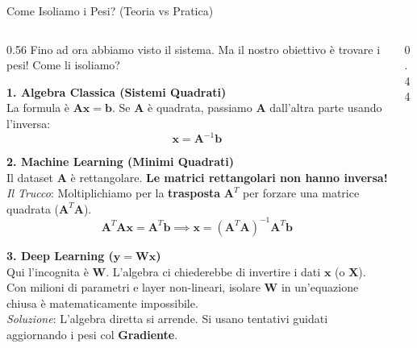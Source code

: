 \documentclass[aspectratio=169, 10pt]{beamer}
\begin{document}
\begin{frame}{Come Isoliamo i Pesi? (Teoria vs Pratica)}
    \begin{columns}[T,onlytextwidth]
        \setlength{\columnsep}{0.3cm}
        
        \begin{column}{0.56\textwidth}
            \vspace{0.1cm}
            \footnotesize
            Fino ad ora abbiamo visto il sistema. Ma il nostro obiettivo è trovare i pesi! Come li isoliamo?
            
            \vspace{0.2cm}
            \textbf{1. Algebra Classica (Sistemi Quadrati)}\\
            La formula è $\mathbf{A}\mathbf{x} = \mathbf{b}$. Se $\mathbf{A}$ è quadrata, passiamo $\mathbf{A}$ dall'altra parte usando l'inversa:
            \[ \mathbf{x} = \mathbf{A}^{-1}\mathbf{b} \]
            
            \vspace{0.1cm}
            \textbf{2. Machine Learning (Minimi Quadrati)}\\
            Il dataset $\mathbf{A}$ è rettangolare. \textbf{Le matrici rettangolari non hanno inversa!} 
            \\ \textit{Il Trucco}: Moltiplichiamo per la \textbf{trasposta} $\mathbf{A}^T$ per forzare una matrice quadrata ($\mathbf{A}^T\mathbf{A}$).
            \[ \mathbf{A}^T\mathbf{A}\mathbf{x} = \mathbf{A}^T\mathbf{b} \implies \mathbf{x} = (\mathbf{A}^T\mathbf{A})^{-1}\mathbf{A}^T\mathbf{b} \]
            
            \vspace{0.1cm}
            \textbf{3. Deep Learning ($\mathbf{y} = \mathbf{W}\mathbf{x}$)}\\
            Qui l'incognita è $\mathbf{W}$. L'algebra ci chiederebbe di invertire i dati $\mathbf{x}$ (o $\mathbf{X}$). Con milioni di parametri e layer non-lineari, isolare $\mathbf{W}$ in un'equazione chiusa è matematicamente impossibile. 
            \\ \textit{Soluzione}: L'algebra diretta si arrende. Si usano tentativi guidati aggiornando i pesi col \textbf{Gradiente}.
        \end{column}
        
        \begin{column}{0.44\textwidth}
            \centering
            \vspace{0.3cm}
\end{column}
\end{columns}
\end{frame}
\end{document}
